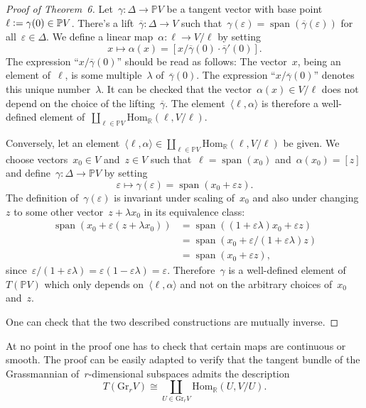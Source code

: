 \documentclass[a4paper,ngerman,12pt]{scrartcl}
\theoremstyle{definition}
\theoremstyle{plain}
\newcommand{\RR}{\mathbb{R}}
\newcommand{\PP}{\mathbb{P}}
\newcommand{\Hom}{\mathrm{Hom}}
\DeclareMathOperator{\Span}{span}
\newcommand{\defeq}{\vcentcolon=}
\begin{document}
\begin{proof}[Proof of Theorem~6]Let~$\gamma : \Delta \to \PP V$ be a tangent
vector with base point~$\ell \defeq \gamma(0) \in \PP V$. There's a
lift~$\overline{\gamma} : \Delta \to V$ such that~$\gamma(\varepsilon) =
\Span(\overline{\gamma}(\varepsilon))$ for all~$\varepsilon \in \Delta$.
We define a linear map~$\alpha : \ell \to V/\ell$ by setting
\[ x \longmapsto \alpha(x) = [x/\overline{\gamma}(0) \cdot
\overline{\gamma}'(0)]. \]
The expression ``$x/\overline{\gamma}(0)$'' should be read as follows: The
vector~$x$, being an element of~$\ell$, is some multiple~$\lambda$
of~$\overline{\gamma}(0)$. The expression ``$x/\overline{\gamma}(0)$'' denotes
this unique number~$\lambda$. It can be checked that the vector~$\alpha(x) \in
V/\ell$ does not depend on the choice of the lifting~$\overline{\gamma}$. The
element~$\langle\ell, \alpha\rangle$ is therefore a well-defined element
of~$\coprod_{\ell \in \PP V} \Hom_\RR(\ell,V/\ell)$.

Conversely, let an element~$\langle\ell, \alpha\rangle \in \coprod_{\ell \in
\PP V} \Hom_\RR(\ell,V/\ell)$ be given. We choose vectors~$x_0 \in V$ and~$z \in V$ such
that~$\ell = \Span(x_0)$ and~$\alpha(x_0) = [z]$ and define~$\gamma : \Delta
\to \PP V$ by setting
\[ \varepsilon \longmapsto \gamma(\varepsilon) = \Span(x_0 + \varepsilon z). \]
The definition of~$\gamma(\varepsilon)$ is invariant under scaling of~$x_0$ and
also under changing~$z$ to some other vector~$z + \lambda x_0$ in its
equivalence class:
\begin{align*}
  \Span(x_0 + \varepsilon (z + \lambda x_0))
  &= \Span((1 + \varepsilon \lambda) x_0 + \varepsilon z) \\
  &= \Span(x_0 + \varepsilon / (1 + \varepsilon \lambda) z) \\
  &= \Span(x_0 + \varepsilon z),
\end{align*}
since~$\varepsilon / (1 + \varepsilon \lambda) = \varepsilon (1 - \varepsilon
\lambda) = \varepsilon$. Therefore~$\gamma$ is a well-defined element of~$T(\PP
V)$ which only depends on~$\langle\ell, \alpha\rangle$ and not on the arbitrary
choices of~$x_0$ and~$z$.

One can check that the two described constructions are mutually inverse.
\end{proof}

At no point in the proof one has to check that certain maps are continuous or
smooth. The proof can be easily adapted to verify that the tangent bundle of
the Grassmannian of~$r$-dimensional subspaces admits the description
\[ T(\mathrm{Gr}_r V) \cong \coprod_{U \in \mathrm{Gr}_r V} \Hom_\RR(U, V/U). \]
\end{document}
